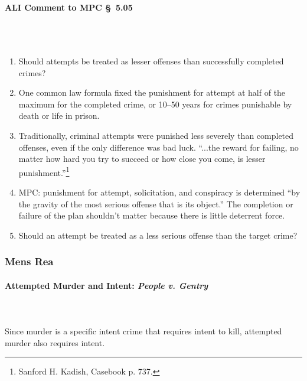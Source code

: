 \paragraph{ALI Comment to MPC \S\ 5.05}
~\\\\
\begin{enumerate}
    \item Should attempts be treated as lesser offenses than successfully 
    completed crimes?
    \item One common law formula fixed the punishment for attempt at half of 
    the maximum for the completed crime, or 10--50 years for crimes punishable 
    by death or life in prison.
    \item Traditionally, criminal attempts were punished less severely than 
    completed offenses, even if the only difference was bad luck. ``...the 
    reward for failing, no matter how hard you try to succeed or how close you 
    come, is lesser punishment.''\footnote{Sanford H. Kadish, Casebook p.  
    737.}
    \item MPC: punishment for attempt, solicitation, and conspiracy is 
    determined ``by the gravity of the most serious offense that is its 
    object.'' The completion or failure of the plan shouldn't matter because 
    there is little deterrent force.
    \item Should an attempt be treated as a less serious offense than the 
    target crime?
\end{enumerate}

\subsubsection{Mens Rea}

\paragraph{Attempted Murder and Intent: \emph{People v. Gentry}}
~\\\\
Since murder is a specific intent crime that requires intent to kill, 
attempted murder also requires intent.

